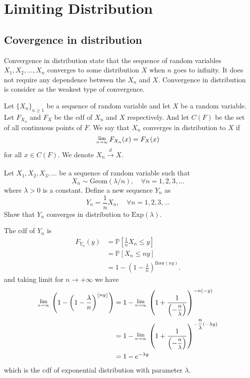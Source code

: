 \chapter{Limiting Distribution}

\section{Covergence in distribution}

Convergence in distribution state that 
the sequence of random variables $X_1, X_2, \ldots, X_n$ 
converges to some distribution $X$ when $n$ goes to infinity.
It does not require any dependence between the $X_n$ and $X$. Convergence in distribution is 
consider as the weakest type of convergence.

\begin{definition}
    Let $\{X_n\}_{n \geq 1}$ be a sequence of random variable and let $X$ be a random variable. Let $F_{X_n}$ and 
    $F_X$ be the cdf of $X_n$ and $X$ respectively. And let $C(F)$ be the set of all continuous points of
    $F$. We say that $X_n$ converges in distribution to $X$ if 
    \begin{equation}
        \Lim{n \to \infty} F_{X_n}(x) = F_X(x)
    \end{equation}
    for all $x \in C(F)$. We denote $X_n \xrightarrow[]{d} X$. 
\end{definition}

\begin{example}
    Let $X_1, X_2, X_3, \ldots$ be a sequence of random variable such that 
    \[
        X_n \sim \text{Geom}(\lambda /n), \quad \forall n = 1,2,3,\ldots
    \]
    where $\lambda > 0$ is a constant. Define a new sequence $Y_n$ as 
    \[
        Y_n = \frac{1}{n}X_n, \quad \forall n = 1,2,3,\ldots
    \]
    Show that $Y_n$ converges in distribution to $\text{Exp}(\lambda)$.
\end{example}

\begin{solution}
    The cdf of $Y_n$ is 
    \begin{align*}
        F_{Y_n}(y) &= \mathbb{P}\left[ \frac{1}{n}X_n \leq y \right]\\
        &= \mathbb{P}\left[ X_n \leq ny \right]\\
        &= 1 - \left( 1- \frac{\lambda}{n} \right)^{\text{floor}(ny)}.
    \end{align*}
    and taking limit for $n \to +\infty$ we have 
    \begin{align*}
        \Lim{n \to \infty} \left( 1 - \left( 1- \frac{\lambda}{n} \right)^{\lfloor ny \rfloor } \right) 
        &= 1 - \Lim{n \to \infty} \left( 1 + \frac{1}{\left(-\mfrac{n}{\lambda} \right)} \right)^{-n(-y)}\\
        &= 1 - \Lim{n \to \infty} \left( 1 + \frac{1}{\left(-\mfrac{n}{\lambda}\right)} \right)^{-\mfrac{n}{\lambda}(-\lambda y)}\\
        &= 1 - e^{-\lambda y}
    \end{align*}
    which is the cdf of exponential distribution with parameter $\lambda$.
\end{solution}

